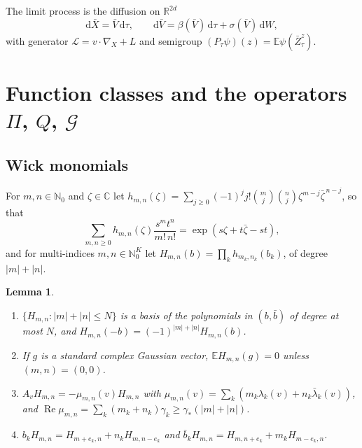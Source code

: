\documentclass[11pt]{article}
\newcommand{\dd}{\mathrm{d}}
\newcommand{\E}{\mathbb{E}}
\newcommand{\cL}{\mathcal{L}}
\newcommand{\cG}{\mathcal{G}}
\newcommand{\R}{\mathbb{R}}
\newcommand{\C}{\mathbb{C}}
\renewcommand{\Re}{\operatorname{Re}}
\newtheorem{lemma}[theorem]{Lemma}
\theoremstyle{remark}
\begin{document}
The limit process is the diffusion on $\R^{2d}$
\begin{equation}
  \dd\bar X=\bar V\,\dd\tau,\qquad
  \dd\bar V=\beta(\bar V)\,\dd\tau+\sigma(\bar V)\,\dd W,
  \label{eq:limit}
\end{equation}
with generator $\cL=v\cdot\nabla_X+L$ and semigroup
$(P_\tau\psi)(z)=\E\psi(\bar Z^z_\tau)$.

\section{Function classes and the operators $\Pi$, $Q$, $\cG$}

\subsection{Wick monomials}

For $m,n\in\mathbb{N}_0$ and $\zeta\in\C$ let
$h_{m,n}(\zeta)=\sum_{j\ge0}(-1)^jj!\binom mj\binom nj
\zeta^{m-j}\bar\zeta^{\,n-j}$, so that
\begin{equation}
  \sum_{m,n\ge0}h_{m,n}(\zeta)\frac{s^mt^n}{m!\,n!}
  =\exp(s\zeta+t\bar\zeta-st),
  \label{eq:gen}
\end{equation}
and for multi-indices $m,n\in\mathbb{N}_0^K$ let
$H_{m,n}(b)=\prod_kh_{m_k,n_k}(b_k)$, of degree $|m|+|n|$.

\begin{lemma}\label{lem:wick}
\begin{enumerate}
  \item[(i)] $\{H_{m,n}:|m|+|n|\le N\}$ is a basis of the polynomials in
    $(b,\bar b)$ of degree at most $N$, and
    $H_{m,n}(-b)=(-1)^{|m|+|n|}H_{m,n}(b)$.
  \item[(ii)] If $g$ is a standard complex Gaussian vector,
    $\E H_{m,n}(g)=0$ unless $(m,n)=(0,0)$.
  \item[(iii)] $A_vH_{m,n}=-\mu_{m,n}(v)H_{m,n}$ with
    $\mu_{m,n}(v)=\sum_k(m_k\lambda_k(v)+n_k\bar\lambda_k(v))$, and
    $\Re\mu_{m,n}=\sum_k(m_k+n_k)\gamma_k\ge\gamma_*(|m|+|n|)$.
  \item[(iv)] $b_kH_{m,n}=H_{m+e_k,n}+n_kH_{m,n-e_k}$ and
    $\bar b_kH_{m,n}=H_{m,n+e_k}+m_kH_{m-e_k,n}$.
\end{enumerate}
\end{lemma}
\end{document}
